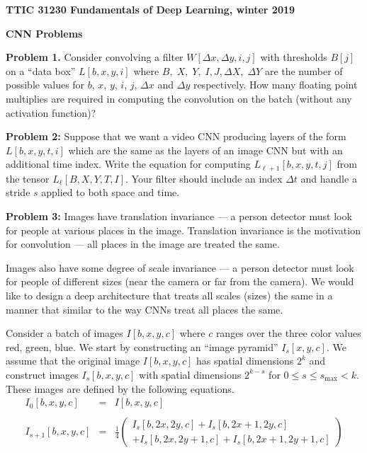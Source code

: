 \documentclass{article}
\newcommand{\solution}[1]{}
\begin{document}
\centerline{\bf TTIC 31230 Fundamentals of Deep Learning, winter 2019}

\medskip
\centerline{\bf CNN Problems}

\bigskip
{\bf Problem 1.}  Consider convolving a filter $W[\Delta x, \Delta y, i,j]$  with thresholds $B[j]$ on a ``data box'' $L[b,x,y,i]$ where $B,\;X,\;Y,\;I, J,\Delta X,\;\Delta Y$
are the number of possible values for $b$, $x$, $y$, $i$, $j$, $\Delta x$ and $\Delta y$ respectively.
How many floating point multiplies are required
in computing the convolution on the batch (without any activation function)?

\solution{$$BD^2N^2C_xC_y$$}

\bigskip
{\bf Problem 2:} Suppose that we want a video CNN producing layers of the form $L[b,x,y,t,i]$ which are the same as the layers of an image CNN but with an additional time index.
Write the equation for computing $L_{\ell+1}[b,x,y,t,j]$ from the tensor $L_\ell[B,X,Y,T,I]$.  Your filter should include an index $\Delta t$ and handle a stride $s$ applied
to both space and time.

\bigskip
{\bf Problem 3:} Images have translation invariance --- a person detector must look for people at various places in the image.  Translation invariance is the motivation for
convolution --- all places in the image are treated the same.

\medskip
Images also have some degree of scale invariance --- a person detector must look for people of different sizes
(near the camera or far from the camera).  We would like to design a deep architecture that treats all scales (sizes) the same in a manner that similar to the way CNNs
treat all places the same.

\medskip
Consider a batch of images
$I[b,x,y,c]$ where $c$ ranges over the three color values red, green, blue. We start by constructing an ``image pyramid'' $I_s[x,y,c]$.
We assume that the original image $I[b,x,y,c]$ has spatial dimensions $2^k$ and construct images $I_s[b,x,y,c]$ with spatial dimensions $2^{k-s}$
for $0 \leq s \leq s_{\mathrm{max}} < k$.  These images are defined by the following equations.
\begin{eqnarray*}
  I_0[b,x,y,c] & = & I[b,x,y,c] \\
  \\
  I_{s+1}[b,x,y,c] & = & \frac{1}{4}\left(\begin{array}{l} I_s[b,2x,2y,c] + I_s[b,2x+1,2y,c] \\ + I_s[b,2x,2y+1,c] + I_s[b,2x+1,2y+1,c]\end{array}\right)
\end{eqnarray*}
\end{document}
